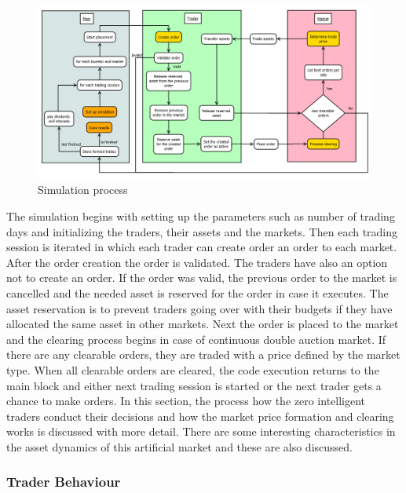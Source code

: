 \begin{figure}
    \includegraphics[width=\linewidth]{diagrams/placement_clearing_process.png}
    \caption{Simulation process}
    \label{fig:sim_proc}
\end{figure}

The simulation begins with setting up the parameters such as number of
trading days and initializing the traders, their assets and the markets.
Then each trading session is iterated in which each trader can create order 
an order to each market. After the order creation the order is validated.
The traders have also an option not to create an order. If the order was
valid, the previous order to the market is cancelled and the needed 
asset is reserved for the order in case it executes. The asset
reservation is to prevent traders going over with their budgets if they
have allocated the same asset in other markets. Next the order is
placed to the market and the clearing process begins in case of 
continuous double auction market. If there are any clearable orders,
they are traded with a price defined by the market type. When
all clearable orders are cleared, the code execution returns to the
main block and either next trading session is started or the next
trader gets a chance to make orders. In this section, the process how the
zero intelligent traders conduct their decisions and how the 
market price formation and clearing works is discussed with more detail.
There are some interesting characteristics in the asset dynamics of this
artificial market and these are also discussed.

\subsubsection{Trader Behaviour}

